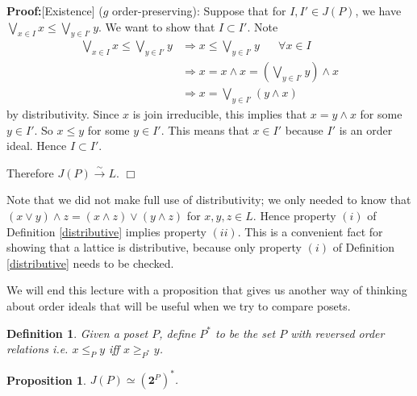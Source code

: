 \documentclass[11pt]{article}
\newtheorem{proposition}[theorem]{Proposition}
\newtheorem{definition}[theorem]{Definition}
\newenvironment{proof}{\noindent \textbf{Proof:}}{$\Box$}
\newcommand{\Bf}[1]{\textbf{#1}}
\newcommand{\imply}{\Longrightarrow}
\newcommand{\wed}{\wedge}
\begin{document}
\begin{proof}[Existence]
($g$ order-preserving): Suppose that for $I,I' \in J(P)$, we have $\bigvee_{x \in I} x \leq \bigvee_{y \in I'} y$. We want to show that $I \subset I'$. Note
\begin{align*}
\bigvee_{x \in I} x \leq \bigvee_{y \in I'} y &\imply x \leq \bigvee_{y \in I'}y \; \; \; \; \; \; \forall x \in I \\ &\imply x=x \wed x=(\bigvee_{y \in I'} y) \wed x  \\ &\imply x=\bigvee_{y \in I'}(y \wed x)
\end{align*}
by distributivity. Since $x$ is join irreducible, this implies that $x=y \wed x$ for some $y \in I'$. So $x \leq y$ for some $y \in I'$. This means that $x \in I'$ because $I'$ is an order ideal. Hence $I \subset I'$.

Therefore $J(P) \stackrel{\sim}{\longrightarrow} L$.
\end{proof}

Note that we did not make full use of distributivity; we only needed to know that $(x \vee y) \wed z= (x \wed z) \vee (y \wed z)$ for $x,y,z \in L$. Hence property $(i)$ of Definition \ref{distributive} implies property $(ii)$. This is a convenient fact for showing that a lattice is distributive, because only property $(i)$ of Definition \ref{distributive} needs to be checked.

We will end this lecture with a proposition that gives us another way of thinking about order ideals that will be useful when we try to compare posets.

\begin{definition}
Given a poset $P$, define $P^*$ to be the set $P$ with reversed order relations i.e. $x \leq_P y$ iff $x \geq_{P^*} y$.
\end{definition}

\begin{proposition}
$J(P) \simeq (\Bf{2}^P)^*$.
\end{proposition}
\end{document}
